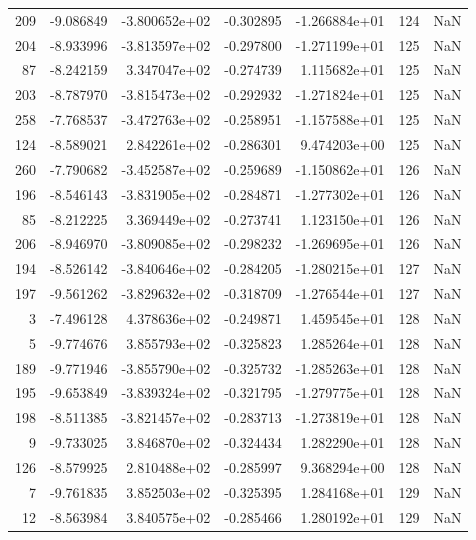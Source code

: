 \begin{tabular}{rrrrrrr}
 209 &  -9.086849 & -3.800652e+02 & -0.302895 & -1.266884e+01 &         124 & NaN \\
 204 &  -8.933996 & -3.813597e+02 & -0.297800 & -1.271199e+01 &         125 & NaN \\
  87 &  -8.242159 &  3.347047e+02 & -0.274739 &  1.115682e+01 &         125 & NaN \\
 203 &  -8.787970 & -3.815473e+02 & -0.292932 & -1.271824e+01 &         125 & NaN \\
 258 &  -7.768537 & -3.472763e+02 & -0.258951 & -1.157588e+01 &         125 & NaN \\
 124 &  -8.589021 &  2.842261e+02 & -0.286301 &  9.474203e+00 &         125 & NaN \\
 260 &  -7.790682 & -3.452587e+02 & -0.259689 & -1.150862e+01 &         126 & NaN \\
 196 &  -8.546143 & -3.831905e+02 & -0.284871 & -1.277302e+01 &         126 & NaN \\
  85 &  -8.212225 &  3.369449e+02 & -0.273741 &  1.123150e+01 &         126 & NaN \\
 206 &  -8.946970 & -3.809085e+02 & -0.298232 & -1.269695e+01 &         126 & NaN \\
 194 &  -8.526142 & -3.840646e+02 & -0.284205 & -1.280215e+01 &         127 & NaN \\
 197 &  -9.561262 & -3.829632e+02 & -0.318709 & -1.276544e+01 &         127 & NaN \\
   3 &  -7.496128 &  4.378636e+02 & -0.249871 &  1.459545e+01 &         128 & NaN \\
   5 &  -9.774676 &  3.855793e+02 & -0.325823 &  1.285264e+01 &         128 & NaN \\
 189 &  -9.771946 & -3.855790e+02 & -0.325732 & -1.285263e+01 &         128 & NaN \\
 195 &  -9.653849 & -3.839324e+02 & -0.321795 & -1.279775e+01 &         128 & NaN \\
 198 &  -8.511385 & -3.821457e+02 & -0.283713 & -1.273819e+01 &         128 & NaN \\
   9 &  -9.733025 &  3.846870e+02 & -0.324434 &  1.282290e+01 &         128 & NaN \\
 126 &  -8.579925 &  2.810488e+02 & -0.285997 &  9.368294e+00 &         128 & NaN \\
   7 &  -9.761835 &  3.852503e+02 & -0.325395 &  1.284168e+01 &         129 & NaN \\
  12 &  -8.563984 &  3.840575e+02 & -0.285466 &  1.280192e+01 &         129 & NaN \\

\end{tabular}
